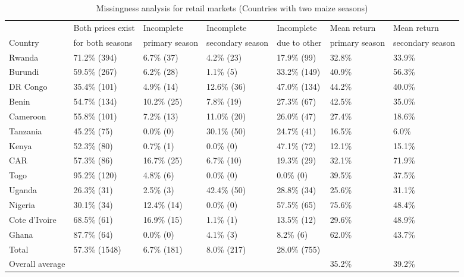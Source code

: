 \begin{table}[ht]
	\centering
	\begin{threeparttable}[t]
		\caption{Missingness analysis for retail markets (Countries with two maize seasons)}
		\label{tab:missing_2}
		\begin{tabular}{|l|llll|ll|}
			\hline
			& Both prices exist  & Incomplete  & Incomplete & Incomplete  & Mean return& Mean return\\ 
			Country & for both seasons & primary season &  secondary season & due to other &primary season & secondary season \\ 
			\hline
Rwanda & 71.2\%  (394) & 6.7\%  (37) & 4.2\%  (23) & 17.9\%  (99) & 32.8\% & 33.9\% \\ 
  Burundi & 59.5\%  (267) & 6.2\%  (28) & 1.1\%   (5) & 33.2\% (149) & 40.9\% & 56.3\% \\ 
  DR Congo & 35.4\%  (101) & 4.9\%  (14) & 12.6\%  (36) & 47.0\% (134) & 44.2\% & 40.0\% \\ 
  Benin & 54.7\%  (134) & 10.2\%  (25) & 7.8\%  (19) & 27.3\%  (67) & 42.5\% & 35.0\% \\ 
  Cameroon & 55.8\%  (101) & 7.2\%  (13) & 11.0\%  (20) & 26.0\%  (47) & 27.4\% & 18.6\% \\ 
  Tanzania & 45.2\%   (75) & 0.0\%   (0) & 30.1\%  (50) & 24.7\%  (41) & 16.5\% & 6.0\% \\ 
  Kenya & 52.3\%   (80) & 0.7\%   (1) & 0.0\%   (0) & 47.1\%  (72) & 12.1\% & 15.1\% \\ 
  CAR & 57.3\%   (86) & 16.7\%  (25) & 6.7\%  (10) & 19.3\%  (29) & 32.1\% & 71.9\% \\ 
  Togo & 95.2\%  (120) & 4.8\%   (6) & 0.0\%   (0) & 0.0\%   (0) & 39.5\% & 37.5\% \\ 
  Uganda & 26.3\%   (31) & 2.5\%   (3) & 42.4\%  (50) & 28.8\%  (34) & 25.6\% & 31.1\% \\ 
  Nigeria & 30.1\%   (34) & 12.4\%  (14) & 0.0\%   (0) & 57.5\%  (65) & 75.6\% & 48.4\% \\ 
  Cote d'Ivoire & 68.5\%   (61) & 16.9\%  (15) & 1.1\%   (1) & 13.5\%  (12) & 29.6\% & 48.9\% \\ 
  Ghana & 87.7\%   (64) & 0.0\%   (0) & 4.1\%   (3) & 8.2\%   (6) & 62.0\% & 43.7\% \\ 
  \hline
  Total & 57.3\% (1548) & 6.7\% (181) & 8.0\% (217) & 28.0\% (755) &  &  \\ 
  Overall average &  &  &  &  & 35.2\% & 39.2\% \\ 

\end{tabular}
\end{threeparttable}
\end{table}

